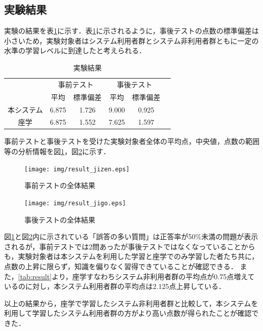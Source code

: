 \subsection{実験結果}
実験の結果を表\ref{tab:result1}に示す．表\ref{tab:result1}に示されるように，事後テストの点数の標準偏差は小さいため，実験対象者はシステム利用者群とシステム非利用者群ともに一定の水準の学習レベルに到達したと考えられる．
\begin{table}[tb]
    \centering
    \caption{実験結果}
    \label{tab:result1}
    \begin{tabular}{|c|c|c|c|c|c}
    \hline
     & \multicolumn{2}{c|}{事前テスト} & \multicolumn{2}{c|}{事後テスト} \\ \cline{2-5}
     & 平均 & 標準偏差 & 平均 & 標準偏差 \\ \hline
     本システム & 6.875 & 1.726 & 9.000 & 0.925 \\ \hline
     座学 & 6.875 & 1.552 & 7.625 & 1.597 \\ \hline
    \end{tabular}
\end{table}

事前テストと事後テストを受けた実験対象者全体の平均点，中央値，点数の範囲等の分析情報を図\ref{fig:result_jizen}，図\ref{fig:result_jigo}に示す．


\begin{figure}[htbp]
\begin{center}
\texttt{[image: img/result\_jizen.eps]}
\end{center}
\caption{事前テストの全体結果}
\label{fig:result_jizen}
\end{figure}

\begin{figure}[htbp]
\begin{center}
\texttt{[image: img/result\_jigo.eps]}
\end{center}
\caption{事後テストの全体結果}
\label{fig:result_jigo}
\end{figure}

図\ref{fig:result_jizen}と図\ref{fig:result_jigo}内に示されている「誤答の多い質問」は正答率が50\%未満の問題が表示されるが，事前テストでは2問あったが事後テストではなくなっていることからも，実験対象者は本システムを利用した学習と座学でのみ学習した者たち共に，点数の上昇に限らず，知識を偏りなく習得できていることが確認できる．
また，\ref{tab:result}より，座学すなわちシステム非利用者群の平均点が0.75点増えているのに対し，本システム利用者群の平均点は2.125点上昇している．

以上の結果から，座学で学習したシステム非利用者群と比較して，本システムを利用して学習したシステム利用者群の方がより高い点数が得られたことが確認できた．